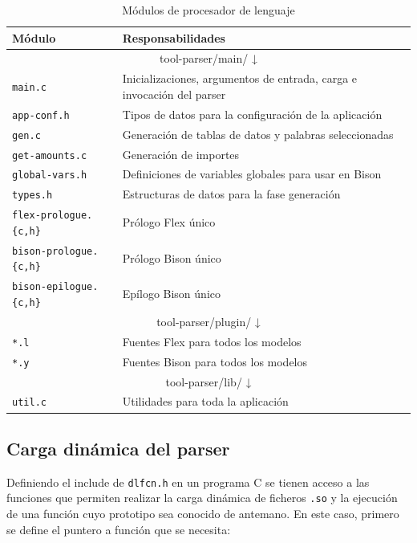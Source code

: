 \begin{table}[ht]
    \centering
    \begin{tabular}{l l}
        Módulo & Responsabilidades \\
        \hline
        \hline
        \multicolumn{2}{c}{tool-parser/main/ ↓} \\
        \hline    
        \verb|main.c| & Inicializaciones, argumentos de entrada, carga e invocación del parser \\
        \verb|app-conf.h| & Tipos de datos para la configuración de la aplicación \\
        \verb|gen.c| & Generación de tablas de datos y palabras seleccionadas \\
        \verb|get-amounts.c| & Generación de importes \\
        \verb|global-vars.h| & Definiciones de variables globales para usar en Bison \\
        \verb|types.h| & Estructuras de datos para la fase generación \\
        \verb|flex-prologue.{c,h}| & Prólogo Flex único \\
        \verb|bison-prologue.{c,h}| & Prólogo Bison único \\
        \verb|bison-epilogue.{c,h}| & Epílogo Bison único \\
        \hline
        \multicolumn{2}{c}{tool-parser/plugin/ ↓} \\            
        \hline        
        \verb|*.l| & Fuentes Flex para todos los modelos \\
        \verb|*.y| & Fuentes Bison para todos los modelos \\
        \hline
        \multicolumn{2}{c}{tool-parser/lib/ ↓} \\     
        \hline
        \verb|util.c| & Utilidades para toda la aplicación \\
    \end{tabular}
    \caption{Módulos de procesador de lenguaje}    
    \label{tab:modulos-procesador-lenguaje}
\end{table}

\subsection{Carga dinámica del parser}

Definiendo el include de \verb|dlfcn.h| en un programa C se tienen acceso a las funciones que permiten realizar la carga dinámica de ficheros \verb|.so| y la ejecución de una función cuyo prototipo sea conocido de antemano. En este caso, primero se define el puntero a función que se necesita:

